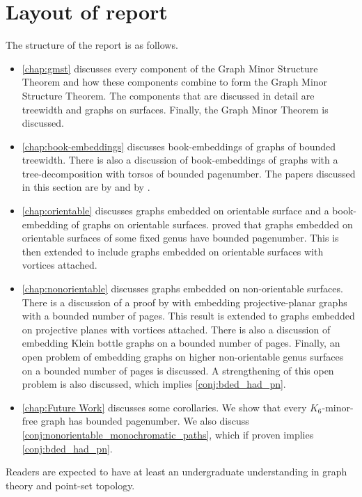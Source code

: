 \section{Layout of report}
The structure of the report is as follows.
\begin{itemize}
	\item \cref{chap:gmst} discusses every component of the Graph Minor Structure Theorem and how these components combine to form the Graph Minor Structure Theorem. The components that are discussed in detail are treewidth and graphs on surfaces. Finally, the Graph Minor Theorem is discussed.
	\item \cref{chap:book-embeddings} discusses book-embeddings of graphs of bounded treewidth. There is also a discussion of book-embeddings of graphs with a tree-decomposition with torsos of bounded pagenumber. The papers discussed in this section are by \textcite{hickingbothamStackNumberCliqueSum2023} and by \textcite{ganleyPagenumberTrees2001}. 
	\item \cref{chap:orientable} discusses graphs embedded on orientable surface and a book-embedding of graphs on orientable surfaces. \textcite{heathPagenumberGenusGraphs1992} proved that graphs embedded on orientable surfaces of some fixed genus have bounded pagenumber. This is then extended to include graphs embedded on orientable surfaces with vortices attached. 
	\item \cref{chap:nonorientable} discusses graphs embedded on non-orientable surfaces. There is a discussion of a proof by \textcite{nakamotoBookEmbeddingProjectiveplanar2015} with embedding projective-planar graphs with a bounded number of pages. This result is extended to graphs embedded on projective planes with vortices attached. There is also a discussion of embedding Klein bottle graphs on a bounded number of pages. Finally, an open problem of embedding graphs on higher non-orientable genus surfaces on a bounded number of pages is discussed. A strengthening of this open problem is also discussed, which implies \cref{conj:bded_had_pn}.
	\item \cref{chap:Future Work} discusses some corollaries. We show that every $K_6$-minor-free graph has bounded pagenumber. We also discuss \cref{conj:nonorientable_monochromatic_paths}, which if proven implies \cref{conj:bded_had_pn}. 
\end{itemize}

Readers are expected to have at least an undergraduate understanding in graph theory and point-set topology. 
